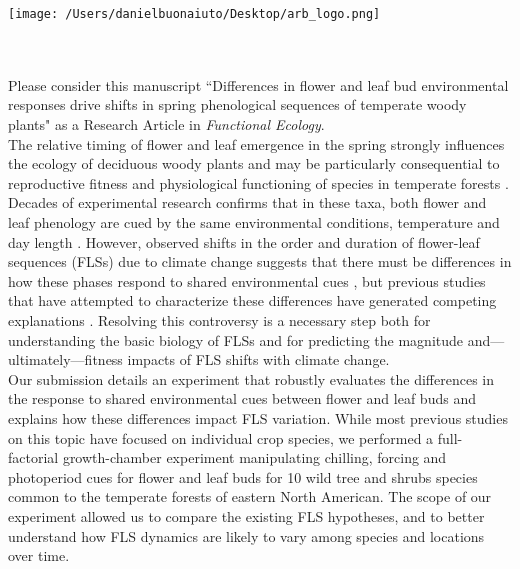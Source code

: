 \documentclass[11.75 pt]{article}\usepackage[]{graphicx}\usepackage[]{color}
\begin{document}

\def\labelitemi{--}
\parindent=24pt
\noindent\texttt{[image: /Users/danielbuonaiuto/Desktop/arb\_logo.png]}
\\\\
\\
\vspace{1.5ex}

\noindent Please consider this manuscript ``Differences in flower and leaf bud environmental responses drive shifts in spring phenological sequences of temperate woody plants" as a Research Article in \textit{Functional Ecology}.\\

\noindent The relative timing of flower and leaf emergence in the spring strongly influences the ecology of deciduous woody plants and may be particularly consequential to reproductive fitness and physiological functioning of species in temperate forests \citep{Rathcke_1985}. Decades of experimental research confirms that in these taxa, both flower and leaf phenology are cued by the same environmental conditions, temperature and day length \citep{Ettinger:2020aa,Forrest2010}. However, observed shifts in the order and duration of flower-leaf sequences (FLSs) due to climate change suggests that there must be differences in how these phases respond to shared environmental cues \citep{Buonaiuto2020}, but previous studies that have attempted to characterize these differences have generated competing explanations \citep [e.g.][]{Guo2014,Citadin2001}. Resolving this controversy is a necessary step both for understanding the basic biology of FLSs and for predicting the magnitude and---ultimately---fitness impacts of FLS shifts with climate change.\\

\noindent Our submission details an experiment that robustly evaluates the differences in the response to shared environmental cues between flower and leaf buds and explains how these differences impact FLS variation. While most previous studies on this topic have focused on individual crop species, we performed a full-factorial growth-chamber experiment manipulating chilling, forcing and photoperiod cues for flower and leaf buds for 10 wild tree and shrubs species common to the temperate forests of eastern North American. The scope of our experiment allowed us to compare the existing FLS hypotheses, and to better understand how FLS dynamics are likely to vary among species and locations over time.\\
\end{document}

